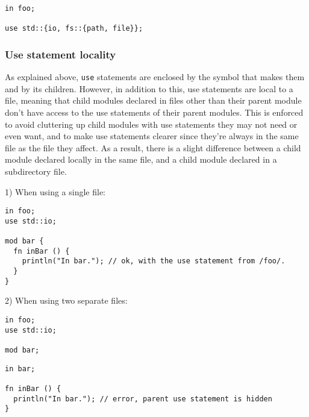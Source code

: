 \begin{lstlisting}[style=coloredverbatim]
in foo;

use std::{io, fs::{path, file}};
\end{lstlisting}

\subsubsection{Use statement locality}

As explained above, \texttt{use} statements are enclosed by the symbol that
makes them and by its children. However, in addition to this, use statements are
local to a file, meaning that child modules declared in files other than their
parent module don't have access to the use statements of their parent modules.
This is enforced to avoid cluttering up child modules with use statements they
may not need or even want, and to make use statements clearer since they're
always in the same file as the file they affect. As a result, there is a slight
difference between a child module declared locally in the same file, and a child
module declared in a subdirectory file.
\smallskip

1) When using a single file:

\begin{lstlisting}[caption=\textit{./foo.yr}, style=coloredverbatim]
in foo;
use std::io;

mod bar {
  fn inBar () {
    println("In bar."); // ok, with the use statement from /foo/.
  }
}
\end{lstlisting}

2) When using two separate files:

\begin{minipage}[t][][t]{0.3\linewidth}
\begin{lstlisting}[caption=\textit{./foo.yr}, style=coloredverbatim]
in foo;
use std::io;

mod bar;
\end{lstlisting}
\end{minipage}%
\hfill%
\begin{minipage}[t][][t]{0.65\linewidth}
\begin{lstlisting}[caption=\textit{./foo/bar.yr}, style=coloredverbatim]
in bar;

fn inBar () {
  println("In bar."); // error, parent use statement is hidden
}
\end{lstlisting}
\end{minipage}%
\smallskip


